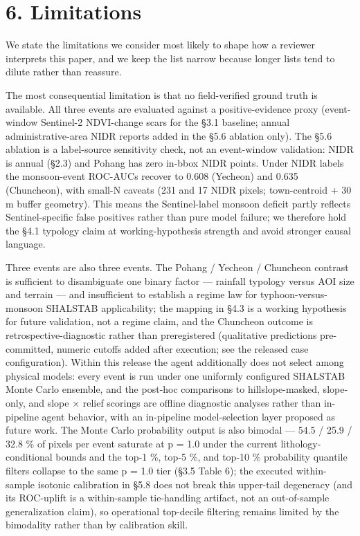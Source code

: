 \documentclass[11pt,a4paper]{article}
\begin{document}
\section{6. Limitations}\label{limitations}

We state the limitations we consider most likely to shape how a reviewer interprets this paper, and we keep the list narrow because longer lists tend to dilute rather than reassure.

The most consequential limitation is that no field-verified ground truth is available. All three events are evaluated against a positive-evidence proxy (event-window Sentinel-2 NDVI-change scars for the §3.1 baseline; annual administrative-area NIDR reports added in the §5.6 ablation only). The §5.6 ablation is a label-source sensitivity check, not an event-window validation: NIDR is annual (§2.3) and Pohang has zero in-bbox NIDR points. Under NIDR labels the monsoon-event ROC-AUCs recover to 0.608 (Yecheon) and 0.635 (Chuncheon), with small-N caveats (231 and 17 NIDR pixels; town-centroid + 30 m buffer geometry). This means the Sentinel-label monsoon deficit partly reflects Sentinel-specific false positives rather than pure model failure; we therefore hold the §4.1 typology claim at working-hypothesis strength and avoid stronger causal language.

Three events are also three events. The Pohang / Yecheon / Chuncheon contrast is sufficient to disambiguate one binary factor --- rainfall typology versus AOI size and terrain --- and insufficient to establish a regime law for typhoon-versus-monsoon SHALSTAB applicability; the mapping in §4.3 is a working hypothesis for future validation, not a regime claim, and the Chuncheon outcome is retrospective-diagnostic rather than preregistered (qualitative predictions pre-committed, numeric cutoffs added after execution; see the released case configuration). Within this release the agent additionally does not select among physical models: every event is run under one uniformly configured SHALSTAB Monte Carlo ensemble, and the post-hoc comparisons to hillslope-masked, slope-only, and slope × relief scorings are offline diagnostic analyses rather than in-pipeline agent behavior, with an in-pipeline model-selection layer proposed as future work. The Monte Carlo probability output is also bimodal --- 54.5 / 25.9 / 32.8 \% of pixels per event saturate at p = 1.0 under the current lithology-conditional bounds and the top-1 \%, top-5 \%, and top-10 \% probability quantile filters collapse to the same p = 1.0 tier (§3.5 Table 6); the executed within-sample isotonic calibration in §5.8 does not break this upper-tail degeneracy (and its ROC-uplift is a within-sample tie-handling artifact, not an out-of-sample generalization claim), so operational top-decile filtering remains limited by the bimodality rather than by calibration skill.
\end{document}
